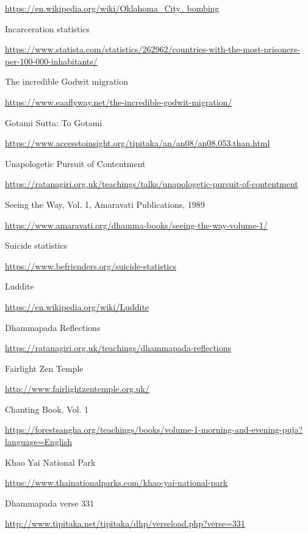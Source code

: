 \begin{thebibliography}{9}
  {\urlsize \url{https://en.wikipedia.org/wiki/Oklahoma_City_bombing}}

 Incarceration statistics

  {\urlsize \url{https://www.statista.com/statistics/262962/countries-with-the-most-prisoners-per-100-000-inhabitants/}}

 The incredible Godwit migration

  {\urlsize \url{https://www.eaaflyway.net/the-incredible-godwit-migration/}}

 Gotami Sutta: To Gotami

  {\urlsize \url{https://www.accesstoinsight.org/tipitaka/an/an08/an08.053.than.html}}

 Unapologetic Pursuit of Contentment

  {\urlsize \url{https://ratanagiri.org.uk/teachings/talks/unapologetic-pursuit-of-contentment}}

 Seeing the Way, Vol. 1, Amaravati Publications, 1989

  {\urlsize \url{https://www.amaravati.org/dhamma-books/seeing-the-way-volume-1/}}

 Suicide statistics

  {\urlsize \url{https://www.befrienders.org/suicide-statistics}}

 Luddite

  {\urlsize \url{https://en.wikipedia.org/wiki/Luddite}}

 Dhammapada Reflections

  {\urlsize \url{https://ratanagiri.org.uk/teachings/dhammapada-reflections}}

 Fairlight Zen Temple

  {\urlsize \url{http://www.fairlightzentemple.org.uk/}}

 Chanting Book, Vol. 1

  {\urlsize \url{https://forestsangha.org/teachings/books/volume-1-morning-and-evening-puja?language=English}}

 Khao Yai National Park

  {\urlsize \url{https://www.thainationalparks.com/khao-yai-national-park}}

 Dhammapada verse 331

  {\urlsize \url{http://www.tipitaka.net/tipitaka/dhp/verseload.php?verse=331}}


\end{thebibliography}
